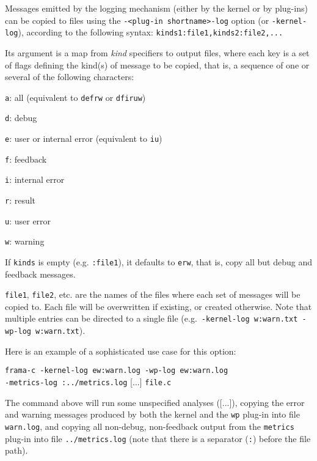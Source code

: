 Messages emitted by the logging mechanism (either by the kernel or by plug-ins)
can be copied to files using the \texttt{-<plug-in shortname>-log} option
(or \texttt{-kernel-log}), according to the following syntax:
 \texttt{kinds1:file1,kinds2:file2,...}

Its argument is a map from {\em kind} specifiers to output files, where
each key is a set of flags defining the kind(s) of
message to be copied, that is, a sequence of one or several of the following
characters:
\begin{description}
\item\texttt{a}: all (equivalent to \texttt{defrw} or \texttt{dfiruw})
\item\texttt{d}: debug
\item\texttt{e}: user or internal error (equivalent to \texttt{iu})
\item\texttt{f}: feedback
\item\texttt{i}: internal error
\item\texttt{r}: result
\item\texttt{u}: user error
\item\texttt{w}: warning
\end{description}
If \texttt{kinds} is empty (e.g. \texttt{:file1}), it defaults to \texttt{erw},
that is, copy all but debug and feedback messages.

\texttt{file1}, \texttt{file2}, etc. are the names of the files where each
set of messages will be copied to.
Each file will be overwritten if existing, or created otherwise.
Note that multiple entries can be directed to a single file
(e.g.~\texttt{-kernel-log w:warn.txt -wp-log w:warn.txt}).

Here is an example of a sophisticated use case for this option:

\texttt{frama-c -kernel-log ew:warn.log -wp-log ew:warn.log \\
  \phantom{\qquad} -metrics-log :../metrics.log} [...] \texttt{file.c}

The command above will run some unspecified analyses ([...]), copying
the error and warning messages produced by both the kernel and the
\texttt{wp} plug-in into file \texttt{warn.log}, and copying all non-debug,
non-feedback output from the \texttt{metrics} plug-in into file
\texttt{../metrics.log} (note that there is a separator (\texttt{:}) before the
file path).

